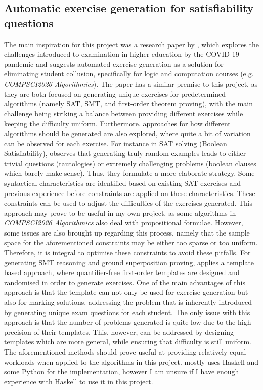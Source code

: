 \documentclass{l4proj}
\begin{document}
\subsection{Automatic exercise generation for satisfiability questions}
The main inspiration for this project was a research paper by \citet{Hoz21}, which explores the challenges introduced to examination in higher education by the COVID-19 pandemic and suggests  automated exercise generation as a solution for eliminating student collusion, specifically for logic and computation courses (e.g. \emph{COMPSCI2026 Algorithmics}). The paper has a similar premise to this project, as they are both focused on generating unique exercises for predetermined algorithms (namely SAT, SMT, and first-order theorem proving), with the main challenge being striking a balance between providing different exercises while keeping the difficulty uniform. Furthermore. approaches for how different algorithms should be generated are also explored, where quite a bit of variation can be observed for each exercise. For instance in SAT solving (Boolean Satisfiability), \citet{Hoz21} observes that generating truly random examples leads to either trivial questions (tautologies) or extremely challenging problems (boolean clauses which barely make sense). Thus, they formulate a more elaborate strategy. Some syntactical characteristics are identified based on existing SAT exercises and previous experience before constraints are applied on these characteristics. These constraints can be used to adjust the difficulties of the exercises generated. This approach may prove to be useful in my own project, as some algorithms in \emph{COMPSCI2026 Algorithmics} also deal with propositional formulae. However, some issues are also brought up regarding this process, namely that the sample space for the aforementioned constraints may be either too sparse or too uniform. Therefore, it is integral to optimise these constraints to avoid these pitfalls. For generating SMT reasoning and ground superposition proving, \citet{Hoz21} applies a template based approach, where quantifier-free first-order templates are designed and randomised in order to generate exercises. One of the main advantages of this approach is that the template can not only be used for exercise generation but also for marking solutions, addressing the problem that is inherently introduced by generating unique exam questions for each student. The only issue with this approach is that the number of problems generated is quite low due to the high precision of their templates. This, however, can be addressed by designing templates which are more general, while ensuring that difficulty is still uniform. The aforementioned methods should prove useful at providing relatively equal workloads when applied to the algorithms in this project. \citet{Hoz21} mostly uses Haskell and some Python for the implementation, however I am unsure if I have enough experience with Haskell to use it in this project.
\end{document}
